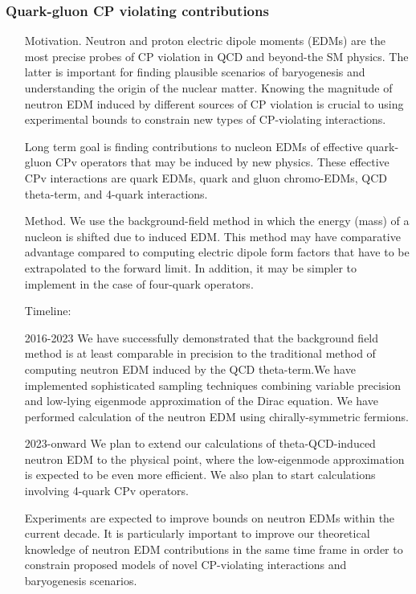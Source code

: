 \documentclass[prd,showpacs,showkeys,preprintnumbers,floatfix,
nofootinbib%
]{revtex4-2}
\begin{document}
\subsubsection{Quark-gluon CP violating contributions}
\begin{itemize}
    \item[Motivation.] Neutron and proton electric dipole moments
      (EDMs) are the most precise probes of CP violation in QCD and
      beyond-the SM physics. The latter is important for finding
      plausible scenarios of baryogenesis and understanding the origin
      of the nuclear matter. Knowing the magnitude of neutron EDM
      induced by different sources of CP violation is crucial to using
      experimental bounds to constrain new types of CP-violating
      interactions. 
    \item[Long term goal] is finding contributions to nucleon EDMs of
      effective quark-gluon CPv operators that may be induced by new
      physics. These effective CPv interactions are quark EDMs, quark
      and gluon chromo-EDMs, QCD theta-term, and 4-quark
      interactions. 
    \item[Method.] We use the background-field method in which the
      energy (mass) of a nucleon is shifted due to induced EDM. This
      method may have comparative advantage compared to computing
      electric dipole form factors that have to be extrapolated to the
      forward limit. In addition, it may be simpler to implement in
      the case of four-quark operators. 
\item[Timeline:]
    \item[2016-2023] We have successfully demonstrated that the
      background field method is at least comparable in precision to
      the traditional method of computing neutron EDM induced by the
      QCD theta-term.We have implemented sophisticated sampling
      techniques combining variable precision and low-lying eigenmode
      approximation of the Dirac equation. We have performed
      calculation of the neutron EDM using chirally-symmetric
      fermions. 
    \item[2023-onward] We plan to extend our calculations of
      theta-QCD-induced neutron EDM to the physical point, where the
      low-eigenmode approximation is expected to be even more
      efficient. We also plan to start calculations involving 4-quark
      CPv operators. 
    \item[Experiments] are expected to improve bounds on neutron EDMs
      within the current decade. It is particularly important to
      improve our theoretical knowledge of neutron EDM contributions
      in the same time frame in order to constrain proposed models of
      novel CP-violating interactions and baryogenesis scenarios. 
\end{itemize}
\end{document}
